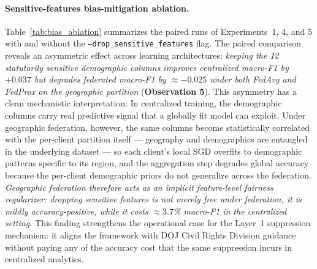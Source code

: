 \documentclass[conference]{IEEEtran}
\begin{document}
\paragraph{Sensitive-features bias-mitigation ablation.}
Table~\ref{tab:bias_ablation} summarizes the paired runs of Experiments~1, 4, and 5 with and without the \texttt{--drop\_sensitive\_features} flag. The paired comparison reveals an asymmetric effect across learning architectures: \textit{keeping the 12 statutorily sensitive demographic columns improves centralized macro-F1 by $+0.037$ but degrades federated macro-F1 by $\approx -0.025$ under both FedAvg and FedProx on the geographic partition} (\textbf{Observation 5}). This asymmetry has a clean mechanistic interpretation. In centralized training, the demographic columns carry real predictive signal that a globally fit model can exploit. Under geographic federation, however, the same columns become statistically correlated with the per-client partition itself --- geography and demographics are entangled in the underlying dataset --- so each client's local SGD overfits to demographic patterns specific to its region, and the aggregation step degrades global accuracy because the per-client demographic priors do not generalize across the federation. \textit{Geographic federation therefore acts as an implicit feature-level fairness regularizer: dropping sensitive features is not merely free under federation, it is mildly accuracy-positive, while it costs $\approx 3.7$\% macro-F1 in the centralized setting.} This finding strengthens the operational case for the Layer~1 suppression mechanism: it aligns the framework with DOJ Civil Rights Division guidance~\cite{doj2016cr} without paying any of the accuracy cost that the same suppression incurs in centralized analytics.

\begin{table}[!htbp]
\centering
\caption{Sensitive-features ablation: paired runs with and without \texttt{--drop\_sensitive\_features} at matched seeds. Macro-F1 is the final-epoch value for centralized and the mean over the last 10 of 50 rounds for federated. The $\Delta$ column is (keep $-$ drop): positive values mean keeping sensitive features helps; negative values mean keeping hurts. Note the sign flip between centralized and federated.}
\label{tab:bias_ablation}
\small
\setlength{\tabcolsep}{4pt}
\end{table}
\end{document}

